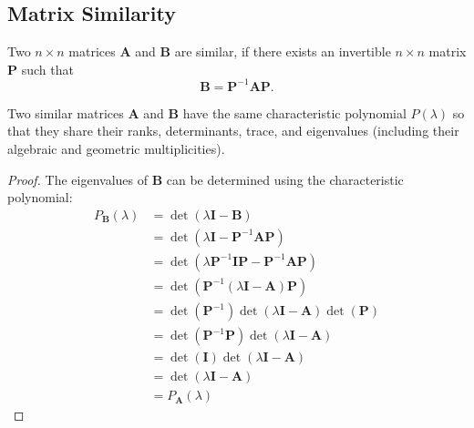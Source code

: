\documentclass{article}
\begin{document}
\subsection{Matrix Similarity}
\begin{definition}
    Two \(n \times n\) matrices \(\symbf{A}\) and \(\symbf{B}\) are similar,
    if there exists an invertible \(n \times n\) matrix \(\symbf{P}\) such that
    \begin{equation*}
        \symbf{B} = \symbf{P}^{-1} \symbf{A} \symbf{P}.
    \end{equation*}
\end{definition}
\begin{theorem}
    Two similar matrices \(\symbf{A}\) and \(\symbf{B}\) have the
    same characteristic polynomial \(P\left( \lambda \right)\) so that they share their ranks,
    determinants, trace, and eigenvalues (including their algebraic and geometric multiplicities).
\end{theorem}
\begin{proof}
    The eigenvalues of \(\symbf{B}\) can be determined using the characteristic polynomial:
    \begin{align*}
        P_{\symbf{B}}\left( \lambda \right) & = \det{\left( \lambda \symbf{I} - \symbf{B} \right)}                                                                    \\
                                            & = \det{\left( \lambda \symbf{I} - \symbf{P}^{-1} \symbf{A} \symbf{P} \right)}                                           \\
                                            & = \det{\left( \lambda \symbf{P}^{-1} \symbf{I} \symbf{P} - \symbf{P}^{-1} \symbf{A} \symbf{P} \right)}                  \\
                                            & = \det{\left( \symbf{P}^{-1} \left( \lambda \symbf{I} - \symbf{A} \right) \symbf{P} \right)}                            \\
                                            & = \det{\left( \symbf{P}^{-1} \right)} \det{\left( \lambda \symbf{I} - \symbf{A} \right)} \det{\left( \symbf{P} \right)} \\
                                            & = \det{\left( \symbf{P}^{-1} \symbf{P} \right)} \det{\left( \lambda \symbf{I} - \symbf{A} \right)}                      \\
                                            & = \det{\left( \symbf{I} \right)} \det{\left( \lambda \symbf{I} - \symbf{A} \right)}                                     \\
                                            & = \det{\left( \lambda \symbf{I} - \symbf{A} \right)}                                                                    \\
                                            & = P_{\symbf{A}}\left( \lambda \right)
    \end{align*}
\end{proof}
\end{document}
